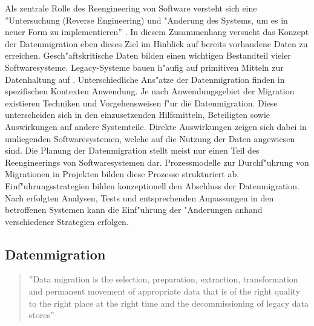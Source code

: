 Als zentrale Rolle des Reengineering von Software versteht sich eine ''Untersuchung (Reverse Engineering) und "Anderung des Systems, um es in neuer Form zu implementieren'' \citep{chikofsky-1990}. In diesem Zusammenhang versucht das Konzept der Datenmigration eben dieses Ziel im Hinblick auf bereits vorhandene Daten zu erreichen. Gesch"aftskritische Daten bilden einen wichtigen Bestandteil vieler Softwaresysteme. Legacy-Systeme bauen h"aufig auf primitiven Mitteln zur Datenhaltung auf \citep{henrard-2002}.
\lb 
Unterschiedliche Ans"atze der Datenmigration finden in spezifischen Kontexten Anwendung. Je nach Anwendungsgebiet der Migration existieren Techniken und Vorgehensweisen f"ur die Datenmigration. Diese unterscheiden sich in den einzusetzenden Hilfsmitteln, Beteiligten sowie Auswirkungen auf andere Systemteile. Direkte Auswirkungen zeigen sich dabei in umliegenden Softwaresystemen, welche auf die Nutzung der Daten angewiesen sind.
\lb
Die Planung der Datenmigration stellt meist nur einen Teil des Reengineerings von Softwaresystemen dar. Prozessmodelle zur Durchf"uhrung von Migrationen in Projekten bilden diese Prozesse strukturiert ab. Einf"uhrungsstrategien bilden konzeptionell den Abschluss der Datenmigration. Nach erfolgten Analysen, Tests und entsprechenden Anpassungen in den betroffenen Systemen kann die Einf"uhrung der "Anderungen anhand verschiedener Strategien erfolgen. 

\subsection{Datenmigration}

\begin{quote}''Data migration is the selection, preparation, extraction, transformation and permanent movement of appropriate data that is of the right quality to the right place at the right time and the decommissioning of legacy data stores'' \flushright\citep[S.~7]{morris-2012}
\end{quote}

